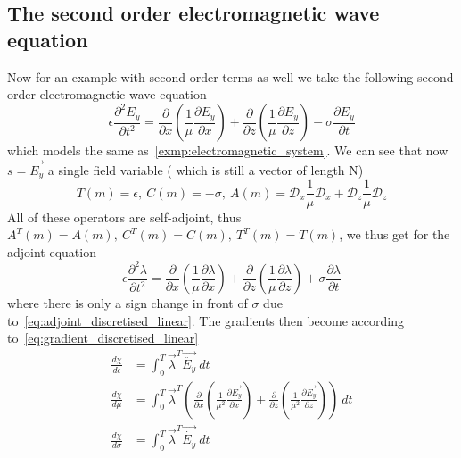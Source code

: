 \documentclass[fleqn,11pt]{SelfArx} %
\newcommand{\pder}[2][]{\frac{\partial#1}{\partial#2}}
\newcommand{\ppder}[2][]{\frac{\partial^2#1}{\partial#2^2}}
\theoremstyle{definition}
\begin{document}
\subsection{The second order electromagnetic wave equation}
Now for an example with second order terms as well we take the following second order electromagnetic wave equation 
\begin{equation}
\epsilon \ppder[E_y]{t} = \pder{x}\left(\frac{1}{\mu}\pder[E_y]{x}\right) + \pder{z}\left(\frac{1}{\mu} \pder[E_y]{z}\right) - \sigma \pder[E_y]{t} 
\end{equation}
which models the same as~\cref{exmp:electromagnetic_system}. We can see that now $s = \vec{E_y}$ a single field variable ( which is still a vector of length N) 
\begin{equation}
T(m) = \epsilon, \ C(m) = -\sigma, \ A(m) = \mathcal{D}_x\frac{1}{\mu}\mathcal{D}_x + \mathcal{D}_z \frac{1}{\mu} \mathcal{D}_z
\end{equation}
All of these operators are self-adjoint, thus $A^T(m) = A(m), \ C^T(m) = C(m), \ T^T(m) = T(m) $, we thus get for the adjoint equation
\begin{equation}
\epsilon \ppder[\lambda]{t} = \pder{x}\left(\frac{1}{\mu}\pder[\lambda]{x}\right) + \pder{z}\left(\frac{1}{\mu} \pder[\lambda]{z}\right) + \sigma \pder[\lambda]{t} 
\end{equation}
where there is only a sign change in front of $\sigma$ due to~\cref{eq:adjoint_discretised_linear}. 
The gradients then become according to~\cref{eq:gradient_discretised_linear}
\begin{equation}
\begin{aligned}
\frac{d\chi}{d\epsilon} &= \int_0^T\vec{\lambda}^T\vec{\ddot{E_y}} \ dt \\
\frac{d\chi}{d\mu} &= \int_0^T\vec{\lambda}^T\left(\pder{x}\left(\frac{1}{\mu^2}\pder[\vec{E_y}]{x}\right) + \pder{z}\left(\frac{1}{\mu^2} \pder[\vec{E_y}]{z}\right)\right)\ dt \\
\frac{d\chi}{d\sigma}& = \int_0^T\vec{\lambda}^T\vec{\dot{E_y}} \  dt
\end{aligned}
\end{equation}
\end{document}
